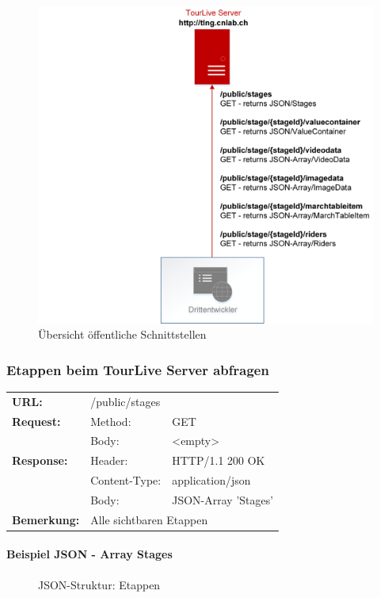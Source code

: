 \begin{figure}[H]
	\centering
	\includegraphics[width=130mm]{images/uebersicht_public_schnittstelle.png}
	\caption{Übersicht öffentliche Schnittstellen}
\end{figure}


\subsubsection{Etappen beim TourLive Server abfragen}
\begin{longtable}{ p{2.5cm} p{3.5cm} p{6cm}}
	\textbf{URL:} & \multicolumn{2}{l}{/public/stages} \\
	\textbf{Request:} & Method: & GET \\
		& Body: & <empty>\\
	\textbf{Response:} &  Header: & HTTP/1.1 200 OK \\
		& Content-Type: & application/json \\
		& Body: & JSON-Array 'Stages'\\
	\textbf{Bemerkung:} & \multicolumn{2}{p{10cm}}{Alle sichtbaren Etappen} 
\end{longtable}
\paragraph{Beispiel JSON - Array Stages}
\begin{figure}[H]
	\centering
	
	\caption{JSON-Struktur: Etappen}
\end{figure}

